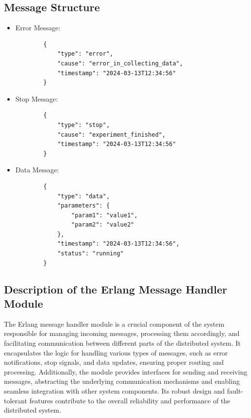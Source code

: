 \subsection{Message Structure}
\begin{itemize}
    \item Error Message:
    \begin{verbatim}
        {
            "type": "error",
            "cause": "error_in_collecting_data",
            "timestamp": "2024-03-13T12:34:56"
        }
    \end{verbatim}
    
    \item Stop Message:
    \begin{verbatim}
        {
            "type": "stop",
            "cause": "experiment_finished",
            "timestamp": "2024-03-13T12:34:56"
        }
    \end{verbatim}
    
    \item Data Message:
    \begin{verbatim}
        {
            "type": "data",
            "parameters": {
                "param1": "value1",
                "param2": "value2"
            },
            "timestamp": "2024-03-13T12:34:56",
            "status": "running"
        }
    \end{verbatim}
\end{itemize}

\subsection{Description of the Erlang Message Handler Module}
The Erlang message handler module is a crucial component of the system responsible for managing incoming messages, processing them accordingly, and facilitating communication between different parts of the distributed system. It encapsulates the logic for handling various types of messages, such as error notifications, stop signals, and data updates, ensuring proper routing and processing. Additionally, the module provides interfaces for sending and receiving messages, abstracting the underlying communication mechanisms and enabling seamless integration with other system components. Its robust design and fault-tolerant features contribute to the overall reliability and performance of the distributed system.